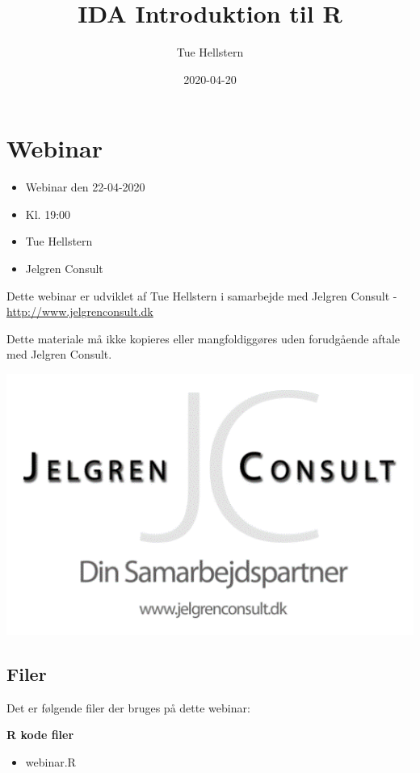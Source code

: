 \documentclass[
]{book}
\title{IDA Introduktion til R}
\author{Tue Hellstern}
\date{2020-04-20}
\providecommand{\tightlist}{%
  \setlength{\itemsep}{0pt}\setlength{\parskip}{0pt}}
\begin{document}
\maketitle

{
\setcounter{tocdepth}{1}
\tableofcontents
}
\hypertarget{webinar}{%
\chapter{Webinar}\label{webinar}}

\begin{itemize}
\tightlist
\item
  Webinar den 22-04-2020
\item
  Kl. 19:00
\item
  Tue Hellstern
\item
  Jelgren Consult
\end{itemize}

Dette webinar er udviklet af Tue Hellstern i samarbejde med Jelgren Consult - \url{http://www.jelgrenconsult.dk}

Dette materiale må ikke kopieres eller mangfoldiggøres uden forudgående aftale med Jelgren Consult.

\includegraphics{img/jelgreen.png}

\hypertarget{filer}{%
\section{Filer}\label{filer}}

Det er følgende filer der bruges på dette webinar:

\textbf{R kode filer}

\begin{itemize}
\tightlist
\item
  webinar.R
\end{itemize}
\end{document}
